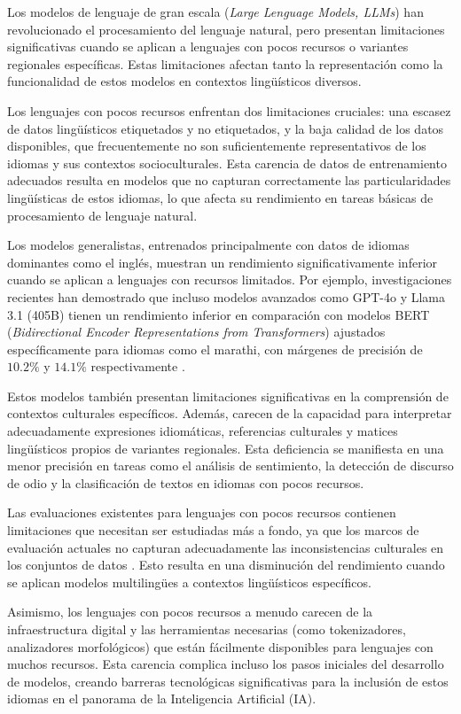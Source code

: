 \documentclass[10pt,twoside]{rcmart} %
\begin{document}
Los modelos de lenguaje de gran escala (\textit{Large Lenguage Models, LLMs}) han revolucionado el procesamiento del lenguaje natural, pero presentan limitaciones significativas cuando se aplican a lenguajes con pocos recursos o variantes regionales específicas. Estas limitaciones afectan tanto la representación como la funcionalidad de estos modelos en contextos lingüísticos diversos.

Los lenguajes con pocos recursos enfrentan dos limitaciones cruciales: una escasez de datos lingüísticos etiquetados y no etiquetados, y la baja calidad de los datos disponibles, que frecuentemente no son suficientemente representativos de los idiomas y sus contextos socioculturales. Esta carencia de datos de entrenamiento adecuados resulta en modelos que no capturan correctamente las particularidades lingüísticas de estos idiomas, lo que afecta su rendimiento en tareas básicas de procesamiento de lenguaje natural.

Los modelos generalistas, entrenados principalmente con datos de idiomas dominantes como el inglés, muestran un rendimiento significativamente inferior cuando se aplican a lenguajes con recursos limitados. Por ejemplo, investigaciones recientes han demostrado que incluso modelos avanzados como GPT-4o y Llama 3.1 (405B) tienen un rendimiento inferior en comparación con modelos BERT (\textit{Bidirectional Encoder Representations from Transformers}) ajustados específicamente para idiomas como el marathi, con márgenes de precisión de $10.2\%$ y $14.1\%$ respectivamente \cite{jadhav2024limitations}.

Estos modelos también presentan limitaciones significativas en la comprensión de contextos culturales específicos. Además, carecen de la capacidad para interpretar adecuadamente expresiones idiomáticas, referencias culturales y matices lingüísticos propios de variantes regionales. Esta deficiencia se manifiesta en una menor precisión en tareas como el análisis de sentimiento, la detección de discurso de odio y la clasificación de textos en idiomas con pocos recursos.

Las evaluaciones existentes para lenguajes con pocos recursos contienen limitaciones que necesitan ser estudiadas más a fondo, ya que los marcos de evaluación actuales no capturan adecuadamente las inconsistencias culturales en los conjuntos de datos \cite{gamboa2024filipino}. Esto resulta en una disminución del rendimiento cuando se aplican modelos multilingües a contextos lingüísticos específicos.

Asimismo, los lenguajes con pocos recursos a menudo carecen de la infraestructura digital y las herramientas necesarias (como tokenizadores, analizadores morfológicos) que están fácilmente disponibles para lenguajes con muchos recursos. Esta carencia complica incluso los pasos iniciales del desarrollo de modelos, creando barreras tecnológicas significativas para la inclusión de estos idiomas en el panorama de la Inteligencia Artificial (IA).
\end{document}

